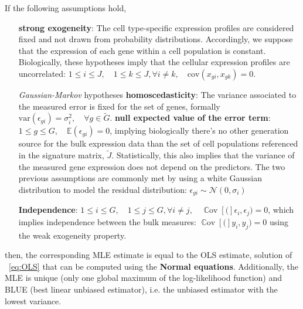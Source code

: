 \documentclass[long, final]{jobim}
\DeclareMathOperator*{\cov}{\mathbb{C}\text{ov}}
\newcommand \CC [1]{\cov\left[{#1}\right]}
\begin{document}
\begin{theorem}
If the following assumptions hold,
\begin{itemize}
    \item[\textbf{strong exogeneity}:] The cell type-specific expression profiles are considered fixed and not drawn from probability distributions. Accordingly, we suppose that the expression of each gene within a cell population is constant. Biologically, these hypotheses imply that the cellular expression profiles are uncorrelated:
  \(1 \le i \le J, \quad 1 \le k \le J, \forall i \neq k, \quad \text{cov}(x_{gi}, x_{gk})=0\).
  \item[\emph{Gaussian-Markov} hypotheses] \textbf{homoscedasticity}: The variance associated to the measured error is fixed for the set of genes, formally
  \(\text{var} \left(\epsilon_{gi}\right)=\sigma_i^2, \quad \forall g \in \widetilde{G}\).   \textbf{null expected value of the error term}:
  \(1 \le g \le G, \quad \mathbb{E}(\epsilon_{gi})=0\), implying
  biologically there's no other generation source for the bulk
  expression data than the set of cell populations referenced in the
  signature matrix, \(\widetilde{J}\). Statistically, this also implies that the variance of the measured gene expression does not depend on the predictors. The two previous assumptions are commonly met by using a white Gaussian distribution to model the residual distribution: $\epsilon_{gi} \sim \mathcal{N}(0, \sigma_i)$
  \item[\textbf{Independence}:] \(1 \le i \le G, \quad 1 \le j \le G, \forall i \neq j, \quad \CC(\epsilon_i, \epsilon_j)=0\),
  which implies independence between the bulk measures:
  \(\CC(y_i, y_j)=0\) using the weak exogeneity property.
\end{itemize}
then, the corresponding MLE estimate is equal to the OLS estimate, solution of \equationname ~\ref{eq:OLS} that can be computed using the \textbf{Normal equations}. Additionally, the MLE is unique (only one global maximum of the log-likelihood function) and BLUE (best linear unbiased estimator), i.e. the unbiased estimator with the lowest variance.
\label{th:MLE_estimate_univariate}    
\end{theorem}


\end{document}
